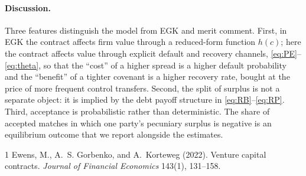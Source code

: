 \documentclass[12pt]{article}
\begin{document}
\paragraph{Discussion.}
Three features distinguish the model from EGK and merit comment. First, in
EGK the contract affects firm value through a reduced-form function $h(c)$;
here the contract affects value through explicit default and recovery
channels, \eqref{eq:PE}--\eqref{eq:theta}, so that the ``cost'' of a higher
spread is a higher default probability and the ``benefit'' of a tighter
covenant is a higher recovery rate, bought at the price of more frequent
control transfers. Second, the split of surplus is not a separate object:
it is implied by the debt payoff structure in \eqref{eq:RB}--\eqref{eq:RP}.
Third, acceptance is probabilistic rather than deterministic. The share of
accepted matches in which one party's pecuniary surplus is negative is an
equilibrium outcome that we report alongside the estimates.

\begin{thebibliography}{1}
Ewens, M., A.~S. Gorbenko, and A.~Korteweg (2022).
\newblock Venture capital contracts.
\newblock \emph{Journal of Financial Economics} 143(1), 131--158.
\end{thebibliography}
\end{document}
